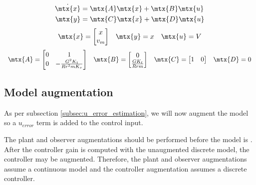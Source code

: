 \begin{theorem}
  \begin{align*}
    \dot{\mtx{x}} &= \mtx{A} \mtx{x} + \mtx{B} \mtx{u} \\
    \mtx{y} &= \mtx{C} \mtx{x} + \mtx{D} \mtx{u}
  \end{align*}
  \begin{equation*}
    \begin{array}{ccc}
      \mtx{x} =
      \begin{bmatrix}
        x \\
        v_m
      \end{bmatrix} &
      \mtx{y} = x &
      \mtx{u} = V
    \end{array}
  \end{equation*}
  \begin{equation}
    \begin{array}{cccc}
      \mtx{A} =
      \begin{bmatrix}
        0 & 1 \\
        0 & -\frac{G^2 K_t}{Rr^2 mK_v}
      \end{bmatrix} &
      \mtx{B} =
      \begin{bmatrix}
        0 \\
        \frac{GK_t}{Rrm}
      \end{bmatrix} &
      \mtx{C} =
      \begin{bmatrix}
        1 & 0
      \end{bmatrix} &
      \mtx{D} = 0
    \end{array}
  \end{equation}
\end{theorem}

\subsection{Model augmentation}

As per subsection \ref{subsec:u_error_estimation}, we will now augment the
\gls{model} so a $u_{error}$ term is added to the \gls{control input}.

The \gls{plant} and \gls{observer} augmentations should be performed before the
\gls{model} is . After the \gls{controller}
gain is computed with the unaugmented discrete \gls{model}, the controller may
be augmented. Therefore, the \gls{plant} and \gls{observer} augmentations assume
a continuous \gls{model} and the \gls{controller} augmentation assumes a
discrete \gls{controller}.

